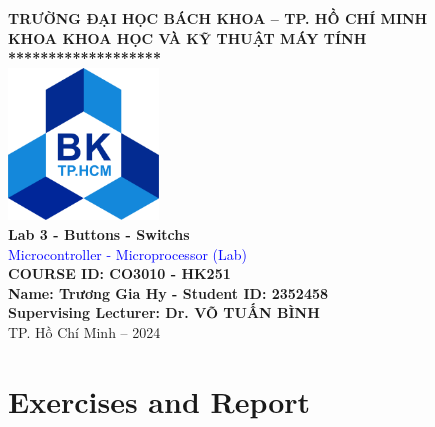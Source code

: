 \documentclass[a4paper,12pt]{article}
\begin{document}

\begin{mdframed}[style=MyFrame]
\thispagestyle{empty}
\begin{center}
    \vspace*{0.5cm}
    {\large \textbf{TRƯỜNG ĐẠI HỌC BÁCH KHOA – TP. HỒ CHÍ MINH}}\\[0.2cm]
    {\large \textbf{KHOA KHOA HỌC VÀ KỸ THUẬT MÁY TÍNH}}\\[0.5cm]
    \textbf{*******************}\\[1cm]

    \includegraphics[width=0.3\textwidth]{bk_logo.png}\\[2cm]

    {\LARGE \textbf{Lab 3 - Buttons - Switchs}}\\[0.5cm]
    {\LARGE \textcolor{blue}{Microcontroller - Microprocessor (Lab)}}\\[0.5cm]
    {\LARGE \textbf{COURSE ID: CO3010 - HK251}}\\[0.5cm]
    \textbf{\large Name: Trương Gia Hy   -   Student ID: 2352458}\\[0.5cm]
    \textbf{\large Supervising Lecturer: Dr. VÕ TUẤN BÌNH}\\[8.5cm]

    {\large TP. Hồ Chí Minh – 2024}
\end{center}
\end{mdframed}

\newpage
\section{Exercises and Report}
\end{document}
